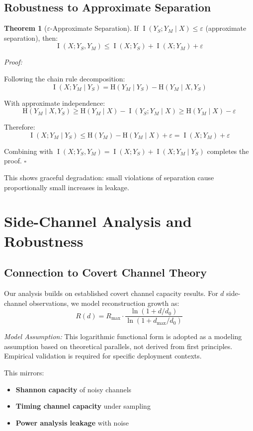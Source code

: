 \documentclass[11pt,a4paper]{article}
\theoremstyle{definition}
\newtheorem{theorem}{Theorem}[section]
\DeclareMathOperator{\I}{I}
\newcommand{\Entropy}{\mathrm{H}}
\newcommand{\given}{\mid}
\begin{document}
\subsection{Robustness to Approximate Separation}

\begin{theorem}[$\varepsilon$-Approximate Separation]\label{thm:robustness}
If $\I(Y_S; Y_M \given X) \leq \varepsilon$ (approximate separation), then:
\[
\I(X; Y_S, Y_M) \leq \I(X; Y_S) + \I(X; Y_M) + \varepsilon
\]
\end{theorem}

\textit{Proof:}

Following the chain rule decomposition:
\[
\I(X; Y_M \given Y_S) = \Entropy(Y_M \given Y_S) - \Entropy(Y_M \given X, Y_S)
\]

With approximate independence:
\[
\Entropy(Y_M \given X, Y_S) \geq \Entropy(Y_M \given X) - \I(Y_S; Y_M \given X) \geq \Entropy(Y_M \given X) - \varepsilon
\]

Therefore:
\[
\I(X; Y_M \given Y_S) \leq \Entropy(Y_M) - \Entropy(Y_M \given X) + \varepsilon = \I(X; Y_M) + \varepsilon
\]

Combining with $\I(X; Y_S, Y_M) = \I(X; Y_S) + \I(X; Y_M \given Y_S)$ completes the proof. $\square$

This shows graceful degradation: small violations of separation cause proportionally small increases in leakage.

\section{Side-Channel Analysis and Robustness}

\subsection{Connection to Covert Channel Theory}

Our analysis builds on established covert channel capacity results. For $d$ side-channel observations, we model reconstruction growth as:
\[
R(d) = R_{\max} \cdot \frac{\ln(1 + d/d_0)}{\ln(1 + d_{\max}/d_0)}
\]

\textit{Model Assumption:} This logarithmic functional form is adopted as a modeling assumption based on theoretical parallels, not derived from first principles. Empirical validation is required for specific deployment contexts.

This mirrors:

\begin{itemize}
    \item \textbf{Shannon capacity} of noisy channels \cite{cover2006}
    \item \textbf{Timing channel capacity} under sampling \cite{giles2002}
    \item \textbf{Power analysis leakage} with noise \cite{kocher1999}
\end{itemize}
\end{document}

